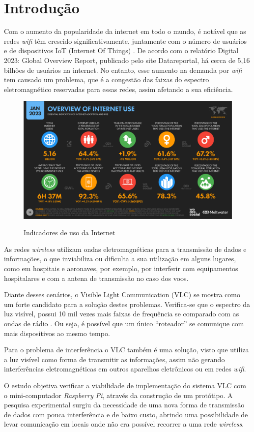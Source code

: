 \chapter{Introdução}

Com o aumento da popularidade da internet em todo o mundo, é notável que as redes \textit{wifi} têm crescido significativamente, juntamente com o número de usuários e de dispositivos IoT (Internet Of Things) \cite{matheus2017comunicaccao}. De acordo com o relatório Digital 2023: Global Overview Report, publicado pelo site Datareportal, há cerca de 5,16 bilhões de usuários na internet. No entanto, esse aumento na demanda por \textit{wifi} tem causado um problema, que é a congestão das faixas do espectro eletromagnético reservadas para essas redes, assim afetando a sua eficiência.

\begin{figure}[!htbp]
  \caption{Indicadores de uso da Internet}
  \includegraphics[scale=0.4]{images/internet_use.png}
  \label{figura:usoInternet}
\end{figure}

As redes \textit{wireless} utilizam ondas eletromagnéticas para a transmissão de dados e informações, o que inviabiliza ou dificulta a sua utilização em alguns lugares, como em hospitais e aeronaves, por exemplo, por interferir com equipamentos hospitalares e com a antena de transmissão no caso dos voos.

Diante desses cenários, o Visible Light Communication (VLC) se mostra como um forte candidato para a solução destes problemas.
Verifica-se que o espectro da luz visível, possui 10 mil vezes mais faixas de frequência se comparado com as ondas de rádio \cite[p. 14]{conceiccao2015comunicaccao}.
Ou seja, é possível que um único ``roteador” se comunique com mais dispositivos ao mesmo tempo.

Para o problema de interferência o VLC também é uma solução, visto que utiliza a luz visível como forma de transmitir as informações, assim não gerando interferências eletromagnéticas em outros aparelhos eletrônicos ou em redes \textit{wifi}.

O estudo objetiva verificar a viabilidade de implementação do sistema VLC com o mini-computador \textit{Raspberry Pi}, através da construção de um protótipo. A pesquisa experimental surgiu da necessidade de uma nova forma de transmissão de dados com pouca interferência e de baixo custo, abrindo uma  possibilidade de levar comunicação em locais onde não era possível recorrer a uma rede \textit{wireless}.

